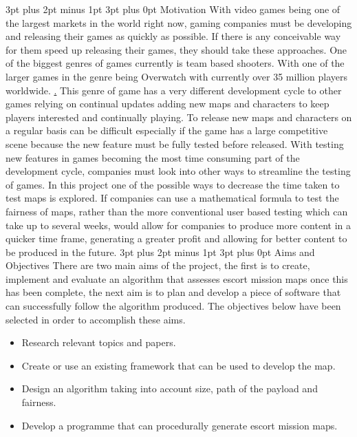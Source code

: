 \documentclass[12pt,a4paper,oneside]{book}
\makeatletter
\renewcommand\subsection{\@startsection {subsection}{1}{2mm} %
                               {3pt plus 2pt minus 1pt} %
                               {3pt plus 0pt} %
                               {\normalfont\bfseries}}
\makeatother
\begin{document}
\subsection{Motivation}
With video games being one of the largest markets in the world right now, gaming companies must be developing and releasing their games as quickly as possible. If there is any conceivable way for them speed up releasing their games, they should take these approaches.
\vspace{5mm} 
\newline  
One of the biggest genres of games currently is team based shooters. With one of the larger games in the genre being Overwatch with currently over 35 million players worldwide. \href{https://twitter.com/PlayOverwatch/status/919925924769906688}. This genre of game has a very different development cycle to other games relying on continual updates adding new maps and characters to keep players interested and continually playing. To release new maps and characters on a regular basis can be difficult especially if the game has a large competitive scene because the new feature \vspace{5mm} must be fully tested before released.
\newline  
With testing new features in games becoming the most time consuming part of the development cycle, companies must look into other ways to streamline the testing of games. In this project one of the possible ways to decrease the time taken to test maps is explored. If companies can use a mathematical formula to test the fairness of maps, rather than the more conventional user based testing which can take up to several weeks, would allow for companies to produce more content in a quicker time frame, generating a greater profit and allowing for better content to be produced in the future. 
\subsection{Aims and Objectives}
There are two main aims of the project, the first is to create, implement and evaluate an algorithm that assesses escort mission maps once this has been complete, the next aim is to plan and develop a piece of software that can successfully follow the algorithm produced. The objectives below have been selected in order to accomplish these aims.
\begin{itemize}
	\item Research relevant topics and papers.
	\item Create or use an existing framework that can be used to develop the map.
	\item Design an algorithm taking into account size, path of the payload and fairness. 
	\item Develop a programme that can procedurally generate escort mission maps.	
\end{itemize}
\end{document}
